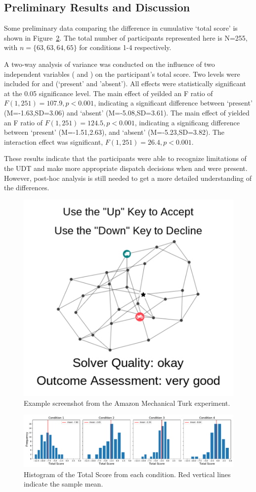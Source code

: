 \subsection{Preliminary Results and Discussion}
Some preliminary data comparing the difference in cumulative `total score' is shown in Figure~\ref{fig:total_score}. The total number of participants represented here is N=255, with $n=\{63,63,64,65\}$ for conditions 1-4 respectively.

A two-way analysis of variance was conducted on the influence of two independent variables (\xQ{} and \xO) on the participant's total score. Two levels were included for \xQ{} and \xO{} (`present' and 'absent'). All effects were statistically significant at the 0.05 significance level. The main effect of \xQ{} yeilded an F ratio of $F(1,251)=107.9,p<0.001$, indicating a significant difference between \xQ `present' (M=-1.63,SD=3.06) and `absent' (M=-5.08,SD=3.61). The main effect of \xO{} yielded an F ratio of $F(1,251)=124.5,p<0.001$, indicating a significang difference between \xO{} `present' (M=-1.51,2.63), and `absent' (M=-5.23,SD=3.82). The interaction effect was significant, $F(1,251)=26.4,p<0.001$.

These results indicate that the participants were able to recognize limitations of the UDT and make more appropriate dispatch decisions when \xQ{} and \xO{} were present. However, post-hoc analysis is still needed to get a more detailed understanding of the differences.

\begin{figure}[tbp]
    \centering
    \includegraphics[width=0.45\linewidth]{Figures/experiment_screenshot_Compressed.png}
    \caption{Example screenshot from the Amazon Mechanical Turk experiment.} 
    \label{fig:experiment_screenshot}
\end{figure}

\begin{figure}[tbp]
    \centering
    \includegraphics[width=1.0\linewidth]{Figures/total_score.pdf}
    \caption{Histogram of the Total Score from each condition. Red vertical lines indicate the sample mean.}
    \label{fig:total_score}
\end{figure}

